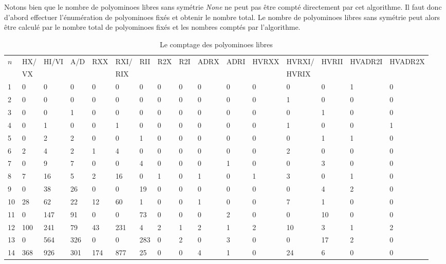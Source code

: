 \documentclass[a4paper,12pt]{article}
\begin{document}
	\par Notons bien que le nombre de polyominoes libres sans symétrie \textit{None} ne peut pas être compté directement par cet algorithme. Il faut donc d'abord effectuer l'énumération de polyominoes fixés et obtenir le nombre total. Le nombre de polyominoes libres sans symétrie peut alors être calculé par le nombre total de polyominoes fixés et les nombres comptés par l'algorithme.
	\begin{landscape}
		\begin{table}[]
			\caption{Le comptage des polyominoes libres}
			\centering
			\label{tab:countfree}
			\begin{tabular}{l|lllllllllllllll}
				\hline
				\hline
				\multirow{2}{*}{$n$} & HX/ & \multirow{2}{*}{HI/VI} & \multirow{2}{*}{A/D} & \multirow{2}{*}{RXX} & RXI/ & \multirow{2}{*}{RII} & \multirow{2}{*}{R2X} & \multirow{2}{*}{R2I} & \multirow{2}{*}{ADRX} & \multirow{2}{*}{ADRI} & \multirow{2}{*}{HVRXX} & HVRXI/ & \multirow{2}{*}{HVRII} & \multirow{2}{*}{HVADR2I} & \multirow{2}{*}{HVADR2X} \\
				& VX &  & & &RIX & & & & & &  &HVRIX & & &\\
				\hline
				1 &0 &0 &0 &0 &0 &0 &0 &0 &0 &0 &0 &0 &0 &1 &0\\
				2 &0 &0 &0 &0 &0 &0 &0 &0 &0 &0 &0 &1 &0 &0 &0\\
				3 &0 &0 &1 &0 &0 &0 &0 &0 &0 &0 &0 &0 &1 &0 &0\\
				4 &0 &1 &0 &0 &1 &0 &0 &0 &0 &0 &0 &1 &0 &0 &1\\
				5 &0 &2 &2 &0 &0 &1 &0 &0 &0 &0 &0 &0 &1 &1 &0\\
				6 &2 &4 &2 &1 &4 &0 &0 &0 &0 &0 &0 &2 &0 &0 &0\\
				7 &0 &9 &7 &0 &0 &4 &0 &0 &0 &1 &0 &0 &3 &0 &0\\
				8 &7 &16 &5 &2 &16 &0 &1 &0 &1 &0 &1 &3 &0 &1 &0\\
				9 &0 &38 &26 &0 &0 &19 &0 &0 &0 &0 &0 &0 &4 &2 &0\\
				10 &28 &62 &22 &12 &60 &1 &0 &0 &1 &0 &0 &7 &1 &0 &0\\
				11 &0 &147 &91 &0 &0 &73 &0 &0 &0 &2 &0 &0 &10 &0 &0\\
				12 &100 &241 &79 &43 &231 &4 &2 &1 &2 &1 &2 &10 &3 &1 &2\\
				13 &0 &564 &326 &0 &0 &283 &0 &2 &0 &3 &0 &0 &17 &2 &0\\
				14 &368 &926 &301 &174 &877 &25 &0 &0 &4 &1 &0 &24 &6 &0 &0\\

\end{tabular}
\end{table}
\end{landscape}
\end{document}
